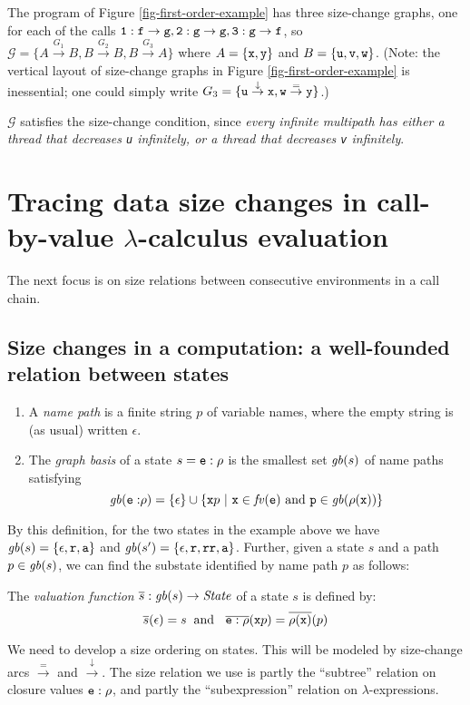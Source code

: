 \documentclass{LMCS}
\newcommand{\cal}{\mathcal}
\newcommand{\fl}{\noindent}
\newcommand{\hair}{\hspace{2mm}}
\newcommand{\be}{\begin{enumerate}}
\newcommand{\ee}{\end{enumerate}}
\newcommand{\bdfn}{\begin{defi}}
\newcommand{\edfn}{\end{defi}}
\theoremstyle{definition}\newtheorem{env}[thm]{Environment}
\begin{document}
\fl{\it The example revisited} 
 The program of Figure \ref{fig-first-order-example} 
has three size-change graphs, one for each of the calls 
${\tt 1}:{\tt f}\to{\tt g}, 
 {\tt 2}:{\tt g}\to{\tt g},
 {\tt 3}:{\tt g}\to{\tt f}$, so
 ${\cal G}=\{A\stackrel{G_1}{\to}B,B\stackrel{G_2}{\to}B,
 B\stackrel{G_3}{\to}A\}
 $
 where $A= \{{\tt x},{\tt y}\}$ and $B=\{{\tt u},{\tt v},{\tt w}\}$.
(Note: the vertical layout
of size-change graphs in Figure \ref{fig-first-order-example} is 
inessential; one could simply write
$G_3 =\{ {\tt u}\stackrel{\downarrow}{\to}{\tt x}, 
         {\tt w}\stackrel{=}{\to}{\tt y}\}$.)

	${\cal G}$  
satisfies the size-change condition, since {\em every infinite multipath 
has either a thread that decreases {\tt u} infinitely, or
a thread that decreases {\tt v} infinitely}.


\section{Tracing data size changes in call-by-value $\lambda$-calculus evaluation}


The next focus is on size relations between consecutive environments 
in a call chain. 


\subsection{Size changes in a computation: a well-founded  relation between states}


\bdfn 
\label{def-graph-nodes}\hfill
\be[(1)]

\item A {\em name path} is  a finite string $p$ of 
variable names, where the empty string is (as usual) written $\epsilon$. 

\item The {\em graph basis} of a state $s={\tt e}:\rho$ is the smallest set  
${\it gb}(s)$ 
of name paths satisfying
$$
{\it gb}({\tt e:}\rho) = \{\epsilon\}\cup
\{ {\tt x}p\ |\ 
{\tt x}\in {\it fv}(\tt e) 
\mbox{\ and\ }
p\in{\it gb}(\rho({\tt x}))\}
$$
\ee
\edfn
By this definition, for the two states in the example above we have
$
{\it gb}(s) = \{\epsilon,{\tt r},{\tt a}\}$ and 
${\it gb}(s') = \{\epsilon,{\tt r},{\tt r}{\tt r},{\tt a}\}
$. Further, given a state $s$ and a path $p\in{\it gb}(s)$, we can 
find the substate identified by name path $p$ as follows: 

\bdfn 
\label{def-graph-valuation}
The {\em valuation function}
$\overline{s}:{\it gb}(s)\to{\it State}$  of a state $s$ 
is defined by: 
 $$\overline{s}(\epsilon)=s\mbox{\rm\hair and \hair}
 \overline{{\tt e}:\rho}({\tt x}p)=\overline{\rho({\tt x})}(p)$$
\edfn
We need to develop a size ordering on states. 
This will  be modeled by size-change arcs
$\stackrel{=}{\to}$ and $\stackrel{\downarrow}{\to}$.
The size relation we use is partly the ``subtree'' relation on closure 
values ${\tt e}:\rho$, and partly the ``subexpression'' relation on 
$\lambda$-expressions.
\end{document}
